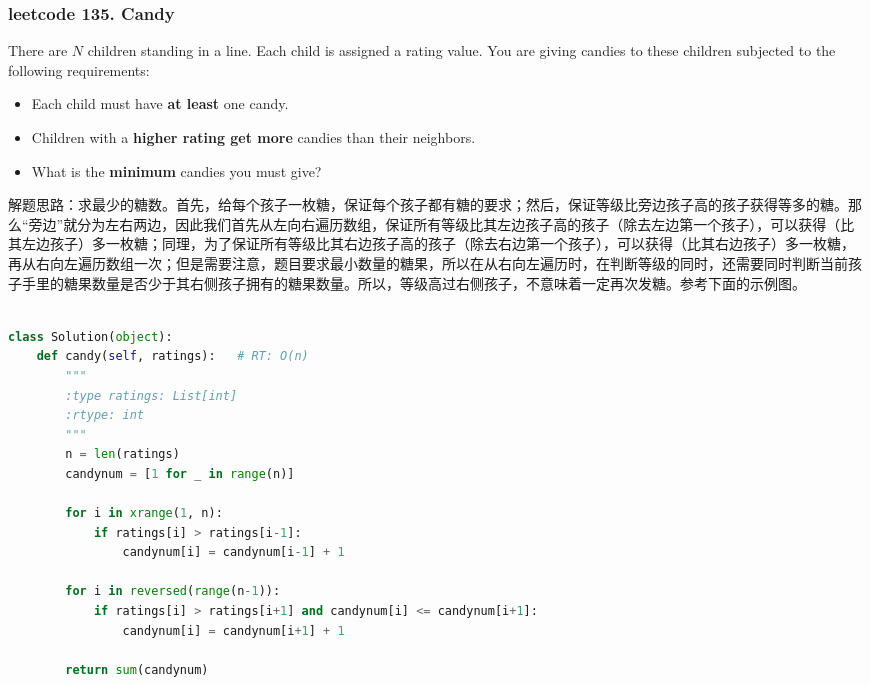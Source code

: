 \documentclass[a4paper,10pt]{article}
\begin{document}
\subsubsection{leetcode 135. Candy}
There are $N$ children standing in a line. Each child is assigned a rating value. You are giving candies to these children subjected to the following requirements:
\begin{itemize}
    \item Each child must have \textbf{at least} one candy.
    \item Children with a \textbf{higher rating get more} candies than their neighbors.
    \item What is the \textbf{minimum} candies you must give?
\end{itemize}

\begin{CJK*}{UTF8}{gbsn}
\noindent 解题思路：求最少的糖数。首先，给每个孩子一枚糖，保证每个孩子都有糖的要求；然后，保证等级比旁边孩子高的孩子获得等多的糖。那么“旁边”就分为左右两边，因此我们首先从左向右遍历数组，保证所有等级比其左边孩子高的孩子（除去左边第一个孩子），可以获得（比其左边孩子）多一枚糖；同理，为了保证所有等级比其右边孩子高的孩子（除去右边第一个孩子），可以获得（比其右边孩子）多一枚糖，再从右向左遍历数组一次；但是需要注意，题目要求最小数量的糖果，所以在从右向左遍历时，在判断等级的同时，还需要同时判断当前孩子手里的糖果数量是否少于其右侧孩子拥有的糖果数量。所以，等级高过右侧孩子，不意味着一定再次发糖。参考下面的示例图。\\
\end{CJK*}

\begin{lstlisting}[language=Python, caption=Problem135. Candy]

class Solution(object):
    def candy(self, ratings):   # RT: O(n)
        """
        :type ratings: List[int]
        :rtype: int
        """
        n = len(ratings)
        candynum = [1 for _ in range(n)]
        
        for i in xrange(1, n):
            if ratings[i] > ratings[i-1]:
                candynum[i] = candynum[i-1] + 1
        
        for i in reversed(range(n-1)):
            if ratings[i] > ratings[i+1] and candynum[i] <= candynum[i+1]:
                candynum[i] = candynum[i+1] + 1
        
        return sum(candynum)
\end{lstlisting}
\end{document}

